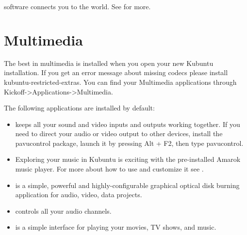 \documentclass[letterpaper,10pt,english]{sphinxmanual}
\begin{document}
 software connects you to the world. See  for more.


\section{Multimedia}
\label{\detokenize{docs/software:multimedia}}
The best in multimedia is installed when you open your new Kubuntu installation. If you get an error message about \sphinxquotedblleft{}missing codecs\sphinxquotedblright{} please install kubuntu-restricted-extras. You can find your Multimedia applications through Kickoff-\textgreater{}Applications-\textgreater{}Multimedia.

The following applications are installed by default:
\begin{itemize}
\item {} 
 keeps all your sound and video inputs and outputs working together. If you need to direct your audio or video output to other devices, install the pavucontrol package, launch it by pressing Alt + F2, then type pavucontrol.

\item {} 
Exploring your music in Kubuntu is exciting with the pre-installed Amarok music player. For more about how to use and customize it see .

\item {} 
 is a simple, powerful and highly-configurable graphical optical disk burning application for audio, video, data projects.

\item {} 
 controls all your audio channels.

\item {} 
 is a simple interface for playing your movies, TV shows, and music.

\end{itemize}
\end{document}
